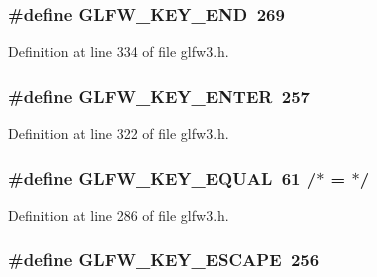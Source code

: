 \subsubsection[{G\+L\+F\+W\+\_\+\+K\+E\+Y\+\_\+\+E\+N\+D}]{\setlength{\rightskip}{0pt plus 5cm}\#define G\+L\+F\+W\+\_\+\+K\+E\+Y\+\_\+\+E\+N\+D~269}\label{group__keys_ga86587ea1df19a65978d3e3b8439bedd9}


Definition at line 334 of file glfw3.\+h.

\hypertarget{group__keys_ga9555a92ecbecdbc1f3435219c571d667}{}
\subsubsection[{G\+L\+F\+W\+\_\+\+K\+E\+Y\+\_\+\+E\+N\+T\+E\+R}]{\setlength{\rightskip}{0pt plus 5cm}\#define G\+L\+F\+W\+\_\+\+K\+E\+Y\+\_\+\+E\+N\+T\+E\+R~257}\label{group__keys_ga9555a92ecbecdbc1f3435219c571d667}


Definition at line 322 of file glfw3.\+h.

\hypertarget{group__keys_gae1a2de47240d6664423c204bdd91bd17}{}
\subsubsection[{G\+L\+F\+W\+\_\+\+K\+E\+Y\+\_\+\+E\+Q\+U\+A\+L}]{\setlength{\rightskip}{0pt plus 5cm}\#define G\+L\+F\+W\+\_\+\+K\+E\+Y\+\_\+\+E\+Q\+U\+A\+L~61  /$\ast$ = $\ast$/}\label{group__keys_gae1a2de47240d6664423c204bdd91bd17}


Definition at line 286 of file glfw3.\+h.

\hypertarget{group__keys_gaac6596c350b635c245113b81c2123b93}{}
\subsubsection[{G\+L\+F\+W\+\_\+\+K\+E\+Y\+\_\+\+E\+S\+C\+A\+P\+E}]{\setlength{\rightskip}{0pt plus 5cm}\#define G\+L\+F\+W\+\_\+\+K\+E\+Y\+\_\+\+E\+S\+C\+A\+P\+E~256}\label{group__keys_gaac6596c350b635c245113b81c2123b93}


